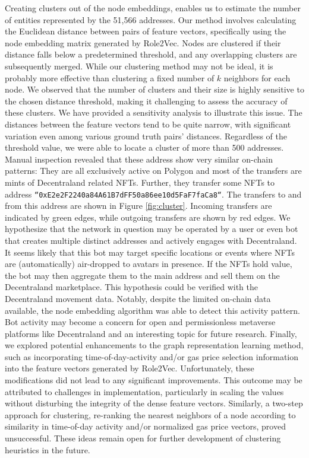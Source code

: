\documentclass[12pt,a4paper,titlepage,oneside,english]{article}
\begin{document}
Creating clusters out of the node embeddings, enables us to estimate the number of entities represented by the 51,566 addresses. Our method involves calculating the Euclidean distance between pairs of feature vectors, specifically using the node embedding matrix generated by Role2Vec. Nodes are clustered if their distance falls below a predetermined threshold, and any overlapping clusters are subsequently merged. \newline 
While our clustering method may not be ideal, it is probably more effective than clustering a fixed number of $k$ neighbors for each node. We observed that the number of clusters and their size is highly sensitive to the chosen distance threshold, making it challenging to assess the accuracy of these clusters. We have provided a sensitivity analysis to illustrate this issue. The distances between the feature vectors tend to be quite narrow, with significant variation even among various ground truth pairs' distances. Regardless of the threshold value, we were able to locate a cluster of more than 500 addresses. Manual inspection revealed that these address show very similar on-chain patterns: They are all exclusively active on Polygon and most of the transfers are mints of Decentraland related NFTs. Further, they transfer some NFTs to address \texttt{``0xE2e2F2240a84A61B7dFF50a86ee10d5FaF7faCa8``}. The transfers to and from this address are shown in Figure \ref{fig:cluster}. Incoming transfers are indicated by green edges, while outgoing transfers are shown by red edges. We hypothesize that the network in question may be operated by a user or even bot that creates multiple distinct addresses and actively engages with Decentraland. It seems likely that this bot may target specific locations or events where NFTs are (automatically) air-dropped to avatars in presence. If the NFTs hold value, the bot may then aggregate them to the main address and sell them on the Decentraland marketplace. This hypothesis could be verified with the Decentraland movement data. \newline
Notably, despite the limited on-chain data available, the node embedding algorithm was able to detect this activity pattern. Bot activity may become a concern for open and permissionless metaverse platforms like Decentraland and an interesting topic for future research. \newline
Finally, we explored potential enhancements to the graph representation learning method, such as incorporating time-of-day-activity and/or gas price selection information into the feature vectors generated by Role2Vec. Unfortunately, these modifications did not lead to any significant improvements. This outcome may be attributed to challenges in implementation, particularly in scaling the values without disturbing the integrity of the dense feature vectors.  
Similarly, a two-step approach for clustering, re-ranking the nearest neighbors of a node according to similarity in time-of-day activity and/or normalized gas price vectors, proved unsuccessful. These ideas remain open for further development of clustering heuristics in the future.
\end{document}
